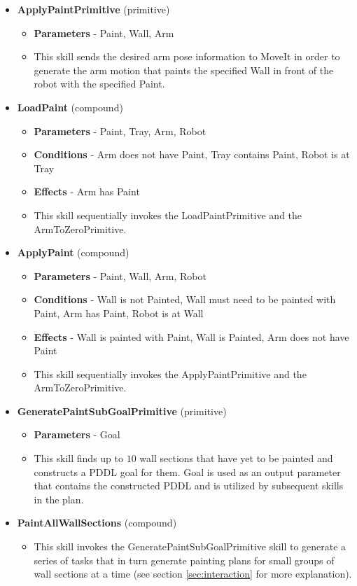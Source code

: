 \begin{itemize}
    \item {\bf ApplyPaintPrimitive} (primitive)
    \begin{itemize}
        \item {\bf Parameters} - Paint, Wall, Arm
        \item This skill sends the desired arm pose information to MoveIt in order to generate the arm motion that paints the specified Wall in front of the robot with the specified Paint.
    \end{itemize}
    
    \item {\bf LoadPaint} (compound)
    \begin{itemize}
        \item {\bf Parameters} - Paint, Tray, Arm, Robot
        \item {\bf Conditions} - Arm does not have Paint, Tray contains Paint, Robot is at Tray
        \item {\bf Effects} - Arm has Paint
        \item This skill sequentially invokes the LoadPaintPrimitive and the ArmToZeroPrimitive.
    \end{itemize}
    
    \item {\bf ApplyPaint} (compound)
    \begin{itemize}
        \item {\bf Parameters} - Paint, Wall, Arm, Robot
        \item {\bf Conditions} - Wall is not Painted, Wall must need to be painted with Paint, Arm has Paint, Robot is at Wall
        \item {\bf Effects} - Wall is painted with Paint, Wall is Painted, Arm does not have Paint
        \item This skill sequentially invokes the ApplyPaintPrimitive and the ArmToZeroPrimitive.
    \end{itemize}
    
    \item {\bf GeneratePaintSubGoalPrimitive} (primitive)
    \begin{itemize}
        \item {\bf Parameters} - Goal
        \item This skill finds up to $10$ wall sections that have yet to be painted and constructs a PDDL goal for them. Goal is used as an output parameter that contains the constructed PDDL and is utilized by subsequent skills in the plan.
    \end{itemize}
    
    \item {\bf PaintAllWallSections} (compound)
    \begin{itemize}
        \item This skill invokes the GeneratePaintSubGoalPrimitive skill to generate a series of tasks that in turn generate painting plans for small groups of wall sections at a time (see section \ref{sec:interaction} for more explanation).
    \end{itemize}
\end{itemize}

